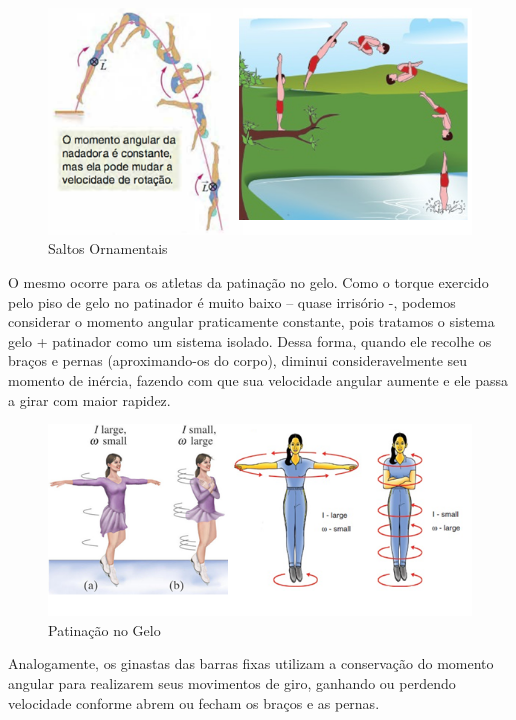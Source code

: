 \begin{figure}[H]
  \centering
  \includegraphics[scale=1.3]{images/i1.png}
  \caption{Saltos Ornamentais}
\end{figure}

O mesmo ocorre para os atletas da patinação no gelo. Como o torque exercido pelo piso de gelo no patinador é muito baixo – quase irrisório -, podemos considerar o momento angular praticamente constante, pois tratamos o sistema gelo + patinador como um sistema isolado. Dessa forma, quando ele recolhe os braços e pernas (aproximando-os do corpo), diminui consideravelmente seu momento de inércia, fazendo com que sua velocidade angular aumente e ele passa a girar com maior rapidez.\\ 

\begin{figure}[H]
  \centering
  \includegraphics[scale=1.3]{images/i2.png}
  \caption{Patinação no Gelo}
\end{figure}

Analogamente, os ginastas das barras fixas utilizam a conservação do momento angular para realizarem seus movimentos de giro, ganhando ou perdendo velocidade conforme abrem ou fecham os braços e as pernas. \\

